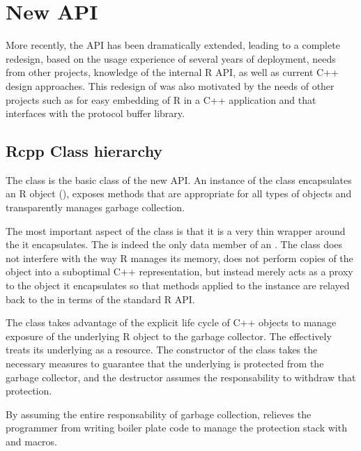 \section{New  API}
\label{sec:new_rcpp}

More recently, the  API has been dramatically extended, leading to a 
complete redesign, based on the usage experience of several 
years of  deployment, needs from other projects, knowledge 
of the internal R API, as well as current C++ design approaches. 
This redesign of  was also motivated by the needs of other 
projects such as   \citep{cran:rinside} for easy embedding 
of R in a C++ application and  \citep{cran:rprotobuf} 
that interfaces with the protocol buffer library. 

\subsection{Rcpp Class hierarchy}

The  class is the basic class of the new  API. 
An instance of the  class encapsulates an R object
(), exposes methods that are appropriate for all types 
of objects and transparently manages garbage collection.

The most important aspect of the  class is that it is 
a very thin wrapper around the  it encapsulates. The 
 is indeed the only data member of an . The 
 class does not interfere with the way R manages its 
memory, does not perform copies of the object into a suboptimal 
C++ representation, but instead merely acts as a proxy to the 
object it encapsulates so that methods applied to the 
instance are relayed back to the  in terms of the standard
R API.

The  class takes advantage of the explicit life cycle of 
C++ objects to manage exposure of the underlying R object to the 
garbage collector. The  effectively treats 
its underlying  as a resource.
The constructor of the  class takes 
the necessary measures to guarantee that the underlying 
is protected from the garbage collector, and the destructor
assumes the responsability to withdraw that protection. 

By assuming the entire responsability of garbage collection, 
relieves the programmer from writing boiler plate code to manage
the protection stack with  and  macros.

